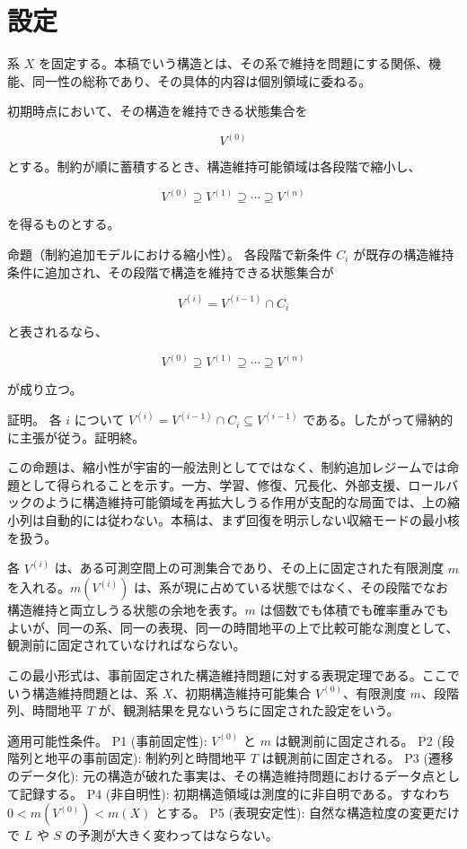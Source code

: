 \documentclass[12pt,a4paper]{article}
\begin{document}
\section{設定}\label{ux8a2dux5b9a}

系 \(X\) を固定する。本稿でいう構造とは、その系で維持を問題にする関係、機能、同一性の総称であり、その具体的内容は個別領域に委ねる。

初期時点において、その構造を維持できる状態集合を

\[
V^{(0)}
\]

とする。制約が順に蓄積するとき、構造維持可能領域は各段階で縮小し、

\[
V^{(0)} \supseteq V^{(1)} \supseteq \cdots \supseteq V^{(n)}
\]

を得るものとする。

命題（制約追加モデルにおける縮小性）。 各段階で新条件 \(C_{i}\) が既存の構造維持条件に追加され、その段階で構造を維持できる状態集合が

\[
V^{(i)} = V^{(i-1)} \cap C_{i}
\]

と表されるなら、

\[
V^{(0)} \supseteq V^{(1)} \supseteq \cdots \supseteq V^{(n)}
\]

が成り立つ。

証明。 各 \(i\) について \(V^{(i)} = V^{(i-1)} \cap C_{i} \subseteq V^{(i-1)}\) である。したがって帰納的に主張が従う。証明終。

この命題は、縮小性が宇宙的一般法則としてではなく、制約追加レジームでは命題として得られることを示す。一方、学習、修復、冗長化、外部支援、ロールバックのように構造維持可能領域を再拡大しうる作用が支配的な局面では、上の縮小列は自動的には従わない。本稿は、まず回復を明示しない収縮モードの最小核を扱う。

各 \(V^{(i)}\) は、ある可測空間上の可測集合であり、その上に固定された有限測度 \(m\) を入れる。\(m(V^{(i)})\) は、系が現に占めている状態ではなく、その段階でなお構造維持と両立しうる状態の余地を表す。\(m\) は個数でも体積でも確率重みでもよいが、同一の系、同一の表現、同一の時間地平の上で比較可能な測度として、観測前に固定されていなければならない。

この最小形式は、事前固定された構造維持問題に対する表現定理である。ここでいう構造維持問題とは、系 \(X\)、初期構造維持可能集合 \(V^{(0)}\)、有限測度 \(m\)、段階列、時間地平 \(T\) が、観測結果を見ないうちに固定された設定をいう。

適用可能性条件。 P1 (事前固定性): \(V^{(0)}\) と \(m\) は観測前に固定される。 P2 (段階列と地平の事前固定): 制約列と時間地平 \(T\) は観測前に固定される。 P3 (遷移のデータ化): 元の構造が破れた事実は、その構造維持問題におけるデータ点として記録する。 P4 (非自明性): 初期構造領域は測度的に非自明である。すなわち \(0<m(V^{(0)})<m(X)\) とする。 P5 (表現安定性): 自然な構造粒度の変更だけで \(L\) や \(S\) の予測が大きく変わってはならない。
\end{document}
